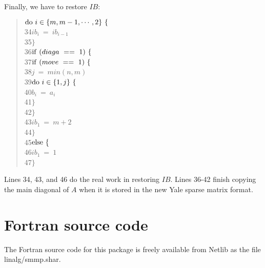 Finally, we have to restore $IB$:
\begin{quote}\hspace*{ 4em}$ {\rm do}\ i\in\{m,m-1,\cdots,2\}\ \{ $ \\
34\hspace*{ 8em}$     ib_{i}\ =\ ib_{i-1} $ \\
35\hspace*{ 8em}$     \} $ \\
36\hspace*{ 4em}$ {\rm if}\ (diaga\ ==\ 1)\ \{ $ \\
37\hspace*{ 8em}$     {\rm if}\ (move\ ==\ 1)\ \{ $ \\
38\hspace*{12em}$         j\ =\ min(n,m) $ \\
39\hspace*{12em}$         {\rm do}\ i\in\{1,j\}\ \{ $ \\
40\hspace*{16em}$             b_{i}\ =\ a_{i} $ \\
41\hspace*{16em}$             \} $ \\
42\hspace*{12em}$         \} $ \\
43\hspace*{ 8em}$     ib_{1}\ =\ m + 2 $ \\
44\hspace*{ 8em}$     \} $ \\
45\hspace*{ 4em}$ {\rm else}\ \{ $ \\
46\hspace*{ 8em}$     ib_{1}\ =\ 1 $ \\
47\hspace*{ 8em}$     \} $
\end{quote}     
Lines 34, 43, and 46 do the real work in restoring $IB$.  Lines 36-42 finish
copying the main diagonal of $A$ when it is stored in the new Yale sparse
matrix format.
 
 
\section{Fortran source code}
\label{Sec:Source_Code}
 
The Fortran source code for this package is freely available from Netlib
as the file linalg/smmp.shar.



